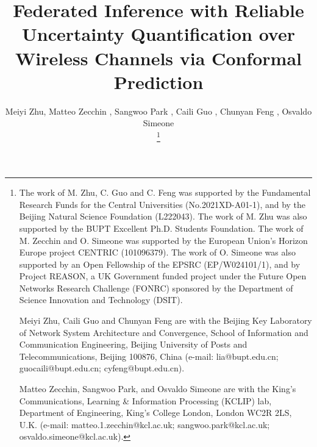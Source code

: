 \documentclass[12pt, draftclsnofoot, onecolumn]{IEEEtran}
\begin{document}
\title{Federated Inference with Reliable Uncertainty Quantification over Wireless Channels via Conformal Prediction}

\author{
Meiyi Zhu, Matteo Zecchin , Sangwoo Park , Caili Guo , Chunyan Feng , Osvaldo Simeone 

\thanks{
The work of M. Zhu, C. Guo and C. Feng was supported by the Fundamental Research Funds for the Central Universities (No.2021XD-A01-1), and by the Beijing Natural Science Foundation (L222043). The work of M. Zhu was also supported by the BUPT Excellent Ph.D. Students Foundation.
The work of M. Zecchin and O. Simeone was supported by the European Union’s Horizon Europe project CENTRIC (101096379). The work of O. Simeone was also supported by an Open Fellowship of the EPSRC (EP/W024101/1), and by Project REASON, a UK Government funded project under the Future Open Networks Research Challenge (FONRC) sponsored by the Department of Science Innovation and Technology (DSIT).

Meiyi Zhu, Caili Guo and Chunyan Feng are with the Beijing Key Laboratory of Network System Architecture and Convergence, School of Information and Communication Engineering, Beijing University of Posts and Telecommunications, Beijing 100876, China (e-mail: lia@bupt.edu.cn; guocaili@bupt.edu.cn; cyfeng@bupt.edu.cn).

Matteo Zecchin, Sangwoo Park, and Osvaldo Simeone are with the King’s Communications, Learning \& Information Processing (KCLIP) lab, Department of Engineering, King’s College London, London WC2R 2LS, U.K. (e-mail: matteo.1.zecchin@kcl.ac.uk; sangwoo.park@kcl.ac.uk; osvaldo.simeone@kcl.ac.uk). 
}
}

\maketitle
\end{document}
